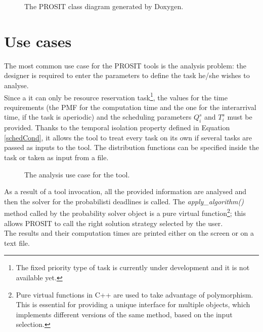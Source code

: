 \begin{figure}[H]
  \caption{The PROSIT class diagram generated by Doxygen.}
  \label{automaton}
\end{figure}

\section{Use cases}
The most common use case for the PROSIT tools is the analysis problem: the designer is required to enter the parameters to define the task he/she wishes to analyse.\\
Since a it can only be resource reservation task\footnote{The fixed priority type of task is currently under development and it is not available yet.}, the values for the time requirements (the PMF for the computation time and the one for the interarrival time, if the task is aperiodic) and the scheduling parameters \( Q_{i}^s \) and \( T_{i}^s \) must be provided. Thanks to the temporal isolation property defined in Equation \ref{schedCond}, it allows the tool to treat every task on its own if several tasks are passed as inputs to the tool. The distribution functions can be specified inside the task or taken as input from a file.
\begin{figure}[H]
  \caption{The analysis use case for the tool.}
  \label{usecase}
\end{figure}

As a result of a tool invocation, all the provided information are analysed and then the solver for the probabilisti deadlines is called. The \emph{apply\_algorithm()} method called by the probability solver object is a pure virtual function\footnote{Pure virtual functions in C++ are used to take advantage of polymorphism. This is essential for providing a unique interface for multiple objects, which implements different versions of the same method, based on the input selection.}; this allows PROSIT to call the right solution strategy selected by the user.\\
The results and their computation times are printed either on the screen or on a text file.

